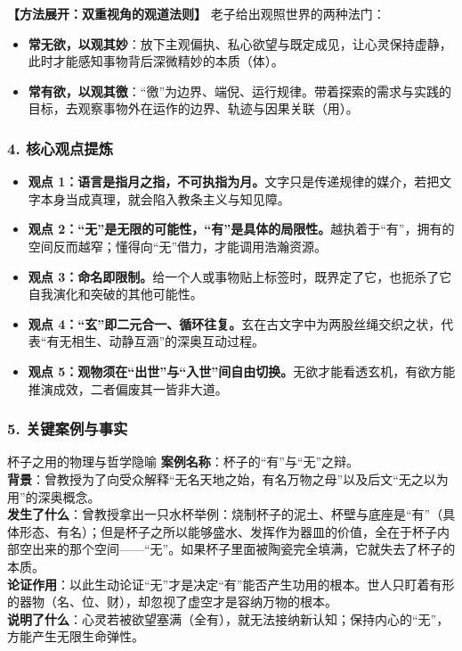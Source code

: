 \noindent\textbf{【方法展开：双重视角的观道法则】}
老子给出观照世界的两种法门：
\begin{itemize}
    \item \textbf{常无欲，以观其妙}：放下主观偏执、私心欲望与既定成见，让心灵保持虚静，此时才能感知事物背后深微精妙的本质（体）。
    \item \textbf{常有欲，以观其徼}：“徼”为边界、端倪、运行规律。带着探索的需求与实践的目标，去观察事物外在运作的边界、轨迹与因果关联（用）。
\end{itemize}

\subsubsection{4. 核心观点提炼}
\begin{itemize}
    \item \textbf{观点 1：语言是指月之指，不可执指为月。}文字只是传递规律的媒介，若把文字本身当成真理，就会陷入教条主义与知见障。
    \item \textbf{观点 2：“无”是无限的可能性，“有”是具体的局限性。}越执着于“有”，拥有的空间反而越窄；懂得向“无”借力，才能调用浩瀚资源。
    \item \textbf{观点 3：命名即限制。}给一个人或事物贴上标签时，既界定了它，也扼杀了它自我演化和突破的其他可能性。
    \item \textbf{观点 4：“玄”即二元合一、循环往复。}玄在古文字中为两股丝绳交织之状，代表“有无相生、动静互涵”的深奥互动过程。
    \item \textbf{观点 5：观物须在“出世”与“入世”间自由切换。}无欲才能看透玄机，有欲方能推演成效，二者偏废其一皆非大道。
\end{itemize}

\subsubsection{5. 关键案例与事实}
\begin{CaseBox}{杯子之用的物理与哲学隐喻}
\textbf{案例名称}：杯子的“有”与“无”之辩。\\
\textbf{背景}：曾教授为了向受众解释“无名天地之始，有名万物之母”以及后文“无之以为用”的深奥概念。\\
\textbf{发生了什么}：曾教授拿出一只水杯举例：烧制杯子的泥土、杯壁与底座是“有”（具体形态、有名）；但是杯子之所以能够盛水、发挥作为器皿的价值，全在于杯子内部空出来的那个空间——“无”。如果杯子里面被陶瓷完全填满，它就失去了杯子的本质。\\
\textbf{论证作用}：以此生动论证“无”才是决定“有”能否产生功用的根本。世人只盯着有形的器物（名、位、财），却忽视了虚空才是容纳万物的根本。\\
\textbf{说明了什么}：心灵若被欲望塞满（全有），就无法接纳新认知；保持内心的“无”，方能产生无限生命弹性。
\end{CaseBox}

